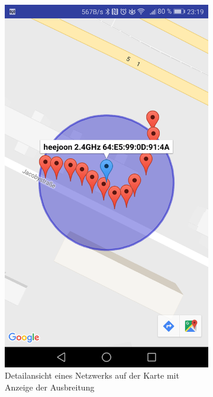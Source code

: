 \documentclass[11pt,a4paper]{article}
\begin{document}
\begin{figure}[htbp]
\begin{subfigure}[htbp]{0.26\textwidth}
        \includegraphics[width=\textwidth]{pics/screenshots/AirSniffer_Detail_Map.png}
        \caption{Detailansicht eines Netzwerks auf der Karte mit Anzeige der Ausbreitung}
        \label{fig:AirSniffer_Detail_Map}
    \end{subfigure}
    \begin{subfigure}[htbp]{0.26\textwidth}

\end{subfigure}
\end{figure}
\end{document}
